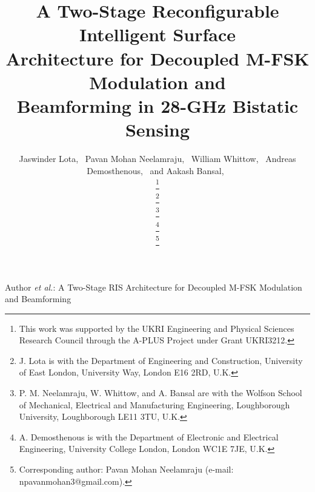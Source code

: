 \documentclass[journal]{IEEEtran}
\begin{document}
\title{A Two-Stage Reconfigurable Intelligent Surface\\
Architecture for Decoupled M-FSK Modulation and\\
Beamforming in 28-GHz Bistatic Sensing}

\author{Jaswinder Lota,~
        Pavan Mohan Neelamraju,~
        William Whittow,~
        Andreas Demosthenous,~
        and Aakash Bansal,~

\thanks{This work was supported by the UKRI Engineering and Physical Sciences Research Council through the A-PLUS Project under Grant UKRI3212.}

\thanks{J. Lota is with the Department of Engineering and Construction, University of East London, University Way, London E16 2RD, U.K.}

\thanks{P. M. Neelamraju, W. Whittow, and A. Bansal are with the Wolfson School of Mechanical, Electrical and Manufacturing Engineering, Loughborough University, Loughborough LE11 3TU, U.K.}

\thanks{A. Demosthenous is with the Department of Electronic and Electrical Engineering, University College London, London WC1E 7JE, U.K.}

\thanks{Corresponding author: Pavan Mohan Neelamraju (e-mail: npavanmohan3@gmail.com).}
}

%
{Author \MakeLowercase{\textit{et al.}}: A Two-Stage RIS Architecture for Decoupled M-FSK Modulation and Beamforming}

\maketitle
\end{document}
